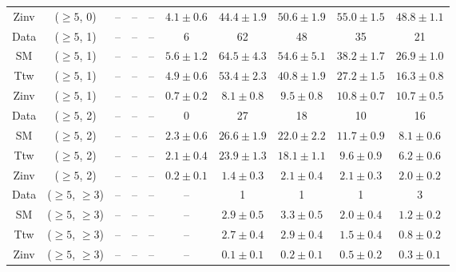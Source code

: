 \begin{table}[h!]
{\begin{tabular}{cccccccccc}
	Zinv & ($\ge5$, 0) & -- & -- & -- & $4.1\pm 0.6$ & $44.4\pm 1.9$ & $50.6\pm 1.9$ & $55.0\pm 1.5$ & $48.8\pm 1.1$ \\[0.5ex] 
	Data & ($\ge5$, 1) & -- & -- & -- & 6 & 62 & 48 & 35 & 21 \\[0.5ex] 
	SM & ($\ge5$, 1) & -- & -- & -- & $5.6\pm 1.2$ & $64.5\pm 4.3$ & $54.6\pm 5.1$ & $38.2\pm 1.7$ & $26.9\pm 1.0$ \\[0.5ex] 
	Ttw & ($\ge5$, 1) & -- & -- & -- & $4.9\pm 0.6$ & $53.4\pm 2.3$ & $40.8\pm 1.9$ & $27.2\pm 1.5$ & $16.3\pm 0.8$ \\[0.5ex] 
	Zinv & ($\ge5$, 1) & -- & -- & -- & $0.7\pm 0.2$ & $8.1\pm 0.8$ & $9.5\pm 0.8$ & $10.8\pm 0.7$ & $10.7\pm 0.5$ \\[0.5ex] 
	Data & ($\ge5$, 2) & -- & -- & -- & 0 & 27 & 18 & 10 & 16 \\[0.5ex] 
	SM & ($\ge5$, 2) & -- & -- & -- & $2.3\pm 0.6$ & $26.6\pm 1.9$ & $22.0\pm 2.2$ & $11.7\pm 0.9$ & $8.1\pm 0.6$ \\[0.5ex] 
	Ttw & ($\ge5$, 2) & -- & -- & -- & $2.1\pm 0.4$ & $23.9\pm 1.3$ & $18.1\pm 1.1$ & $9.6\pm 0.9$ & $6.2\pm 0.6$ \\[0.5ex] 
	Zinv & ($\ge5$, 2) & -- & -- & -- & $0.2\pm 0.1$ & $1.4\pm 0.3$ & $2.1\pm 0.4$ & $2.1\pm 0.3$ & $2.0\pm 0.2$ \\[0.5ex] 
	Data & ($\ge5$, $\ge3$) & -- & -- & -- & -- & 1 & 1 & 1 & 3 \\[0.5ex] 
	SM & ($\ge5$, $\ge3$) & -- & -- & -- & -- & $2.9\pm 0.5$ & $3.3\pm 0.5$ & $2.0\pm 0.4$ & $1.2\pm 0.2$ \\[0.5ex] 
	Ttw & ($\ge5$, $\ge3$) & -- & -- & -- & -- & $2.7\pm 0.4$ & $2.9\pm 0.4$ & $1.5\pm 0.4$ & $0.8\pm 0.2$ \\[0.5ex] 
	Zinv & ($\ge5$, $\ge3$) & -- & -- & -- & -- & $0.1\pm 0.1$ & $0.2\pm 0.1$ & $0.5\pm 0.2$ & $0.3\pm 0.1$ \\[0.5ex] 
	\hline
	\hline
\end{tabular}}
\end{table}
